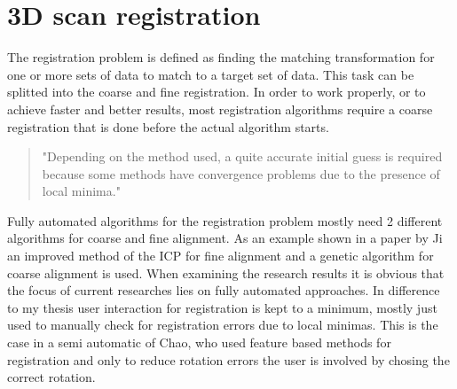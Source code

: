 \documentclass[hyperref,english,bachelorofscience,bibnum]{cgvpub}
\begin{document}
\chapter{3D scan registration}
The registration problem is defined as finding the matching transformation for one or more sets of data to match to a target set of data.%
This task can be splitted into the coarse and fine registration.
In order to work properly, or to achieve faster and better results, most registration algorithms require a coarse registration that is done before the actual algorithm starts. 
\begin{quote}
"Depending on the method used, a quite accurate initial
guess is required because some methods have convergence
problems due to the presence of local minima."\cite{salvi2007}
\end{quote}
Fully automated algorithms for the registration problem mostly need 2 different algorithms for coarse and fine alignment. As an example shown in a paper by Ji \cite{Ji2017} an improved method of the ICP for fine alignment and a genetic algorithm for coarse alignment is used. When examining the research results it is obvious that the focus of current researches lies on fully automated approaches. In difference to my thesis user interaction for registration is kept to a minimum, mostly just used to manually check for registration errors due to local minimas. This is the case in a semi automatic of Chao, who used feature based methods for registration and only to reduce rotation errors the user is involved by chosing the correct rotation.\cite{Chao}
\end{document}
